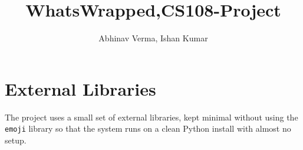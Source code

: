 \documentclass[12pt]{article}
\begin{document}

\title{WhatsWrapped,CS108-Project}
\author{Abhinav Verma, Ishan Kumar}
\maketitle
\newpage

\thispagestyle{empty}
\tableofcontents
\newpage

\setcounter{page}{1}

\section{External Libraries}

The project uses a small set of external libraries, kept minimal without using the \texttt{emoji} library so
that the system runs on a clean Python install with almost no setup.
\end{document}
